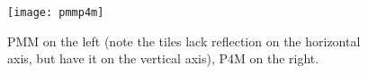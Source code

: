 \begin{figure}[!ht]
\centering
\texttt{[image: pmmp4m]}
\caption{PMM on the left (note the tiles lack reflection on the horizontal axis, but have it on the vertical axis), P4M on the right.}
\label{pmmp4m}
\end{figure}